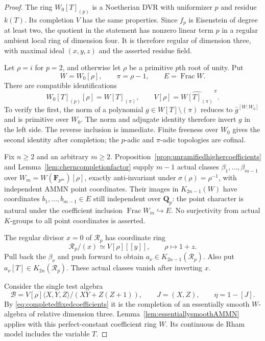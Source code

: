 \documentclass[11pt,a4paper]{article}
\theoremstyle{remark}
\newcommand{\Q}{\mathbf Q}
\newcommand{\F}{\mathbf F}
\newcommand{\Frac}{\operatorname{Frac}}
\begin{document}
\begin{proof}
The ring $W_0[T]_{(p)}$ is a Noetherian DVR with uniformizer
$p$ and residue $k(T)$. Its completion $V$ has the same
properties. Since $f_p$ is Eisenstein of degree at least two,
the quotient in the statement has nonzero linear term $p$
in a regular ambient local ring of dimension four.
It is therefore regular of dimension three, with maximal
ideal $(x,y,z)$ and the asserted residue field.

Let $\rho=i$ for $p=2$, and otherwise let $\rho$ be a primitive
$p$th root of unity. Put
\[
 W=W_0[\rho],\qquad \pi=\rho-1,\qquad E=\Frac W.
\]
There are compatible identifications
\begin{equation}\label{eq:completedfixedcoefficients}
 W_0[T]_{(p)}[\rho]=W[T]_{(\pi)},\qquad
 V[\rho]=\widehat{W[T]_{(\pi)}}^{\,\pi}.
\end{equation}
To verify the first, the norm of a polynomial
$g\in W[T]\setminus(\pi)$ reduces to $\bar g^{[W:W_0]}$
and is primitive over $W_0$. The norm and adjugate identity
therefore invert $g$ in the left side. The reverse inclusion
is immediate. Finite freeness over $W_0$ gives the second
identity after completion; the $p$-adic and $\pi$-adic
topologies are cofinal.

Fix $n\geq2$ and an arbitrary $m\geq2$.
Proposition~\ref{prop:unramifiedhighercoefficients} and
Lemma~\ref{lem:cherncompletionfactor} supply $m-1$ actual
classes $\beta_1,\ldots,\beta_{m-1}$ over
$W_m=W(\F_{p^m})[\rho]$, exactly anti-invariant under
$\sigma(\rho)=\rho^{-1}$, with independent AMMN point
coordinates. Their images in $K_{2n-1}(W)$ have coordinates
$b_1,\ldots,b_{m-1}\in E$ still independent over $\Q_p$:
the point character is natural under the coefficient inclusion
$\Frac W_m\hookrightarrow E$.
No surjectivity from actual $K$-groups to all point coordinates
is asserted.

The regular divisor $x=0$ of $\mathcal R_p$ has coordinate ring
\[
 \mathcal R_p/(x)\simeq V[\rho][[y]],
 \qquad \rho\longmapsto1+z.
\]
Pull back the $\beta_\nu$ and push forward to obtain
$a_\nu\in K_{2n-1}(\mathcal R_p)$.
Also put $a_\nu[T]\in K_{2n}(\mathcal R_p)$.
These actual classes vanish after inverting $x$.

Consider the single test algebra
\[
 \mathcal B=V[\rho]\langle X,Y,Z\rangle/(XY+Z(Z+1)),
 \qquad J=(X,Z),\qquad\eta=1-[J].
\]
By \eqref{eq:completedfixedcoefficients} it is the completion
of an essentially smooth $W$-algebra of relative dimension
three. Lemma~\ref{lem:essentiallysmoothAMMN} applies with
this perfect-constant coefficient ring $W$.
Its continuous de Rham model includes the variable $T$.


\end{proof}
\end{document}
